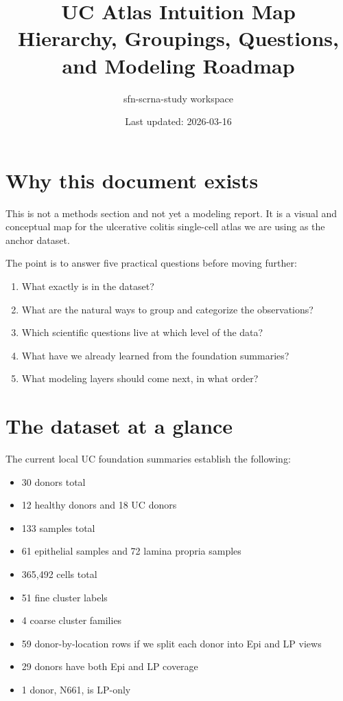 \documentclass[11pt]{article}
\title{UC Atlas Intuition Map\\
\large Hierarchy, Groupings, Questions, and Modeling Roadmap}
\author{sfn-scrna-study workspace}
\date{Last updated: 2026-03-16}
\begin{document}
\maketitle

\section*{Why this document exists}

This is not a methods section and not yet a modeling report.
It is a visual and conceptual map for the ulcerative colitis single-cell atlas
we are using as the anchor dataset.

The point is to answer five practical questions before moving further:

\begin{enumerate}
  \item What exactly is in the dataset?
  \item What are the natural ways to group and categorize the observations?
  \item Which scientific questions live at which level of the data?
  \item What have we already learned from the foundation summaries?
  \item What modeling layers should come next, in what order?
\end{enumerate}

\section*{The dataset at a glance}

The current local UC foundation summaries establish the following:

\begin{itemize}
  \item 30 donors total
  \item 12 healthy donors and 18 UC donors
  \item 133 samples total
  \item 61 epithelial samples and 72 lamina propria samples
  \item 365{,}492 cells total
  \item 51 fine cluster labels
  \item 4 coarse cluster families
  \item 59 donor-by-location rows if we split each donor into Epi and LP views
  \item 29 donors have both Epi and LP coverage
  \item 1 donor, N661, is LP-only
\end{itemize}
\end{document}
